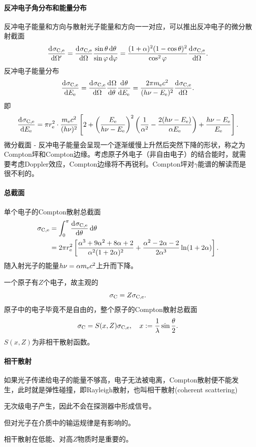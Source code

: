 \paragraph{反冲电子角分布和能量分布}
反冲电子能量和方向与散射光子能量和方向一一对应，可以推出反冲电子的微分散射截面
\[
	\frac{\mathrm{d}^{{}}\sigma_{\mathrm C,\mathrm e}}{\mathrm{d}{\Omega'}^{{}}}=\frac{\mathrm{d}^{{}}\sigma_{\mathrm C,\mathrm e}}{\mathrm{d}{\Omega}^{{}}}\frac{\sin\theta\mathop{}\!\mathrm{d}\theta}{\sin\varphi\mathop{}\!\mathrm{d}\varphi}=\frac{(1+\alpha)^2(1-\cos\theta)^2}{\cos^2\varphi}\frac{\mathrm{d}^{{}}\sigma_{\mathrm C,\mathrm e}}{\mathrm{d}{\Omega}^{{}}}.
\]
反冲电子能量分布
\[
	\frac{\mathrm{d}^{{}}\sigma_{\mathrm C,\mathrm e}}{\mathrm{d}{E_\mathrm e}^{{}}}=\frac{\mathrm{d}^{{}}\sigma_{\mathrm C,\mathrm e}}{\mathrm{d}{\Omega}^{{}}}\frac{\mathrm{d}^{{}}\Omega}{\mathrm{d}{\theta}^{{}}}\frac{\mathrm{d}^{{}}\theta}{\mathrm{d}{E_\mathrm e}^{{}}}=\frac{2\pi m_\mathrm e c^2}{(h\nu-E_\mathrm e)^2}\frac{\mathrm{d}^{{}}\sigma_{\mathrm C,\mathrm e}}{\mathrm{d}{\Omega}^{{}}}.
\]
即
\[
	\frac{\mathrm{d}^{{}}\sigma_{\mathrm C,\mathrm e}}{\mathrm{d}{E_\mathrm e}^{{}}}=\pi r_\mathrm e^2\cdot\frac{m_\mathrm e c^2}{(h\nu)^2}\left[2+\left(\frac{E_\mathrm e}{h\nu-E_\mathrm e}\right)^2\left(\frac1{\alpha^2}-\frac{2(h\nu-E_\mathrm e)}{\alpha E_\mathrm e}\right)+\frac{h\nu-E_\mathrm e}{E_\mathrm e}\right].
\]
微分截面 - 反冲电子能量会呈现一个逐渐缓慢上升然后突然下降的形状，称之为Compton坪和Compton边缘。考虑原子外电子（非自由电子）的结合能时，就需要考虑Doppler效应，Compton边缘将不再锐利。Compton坪对$\gamma$能谱的解读而是很不利的。

\paragraph{总截面}单个电子的Compton散射总截面
\begin{align*}
	\sigma_{\mathrm C,\mathrm e}&=\int_0^\pi\frac{\mathrm{d}^{{}}\sigma_{\mathrm C,\mathrm e}}{\mathrm{d}{\theta}^{{}}}\mathop{}\!\mathrm{d}\theta\\
	&=2\pi r_\mathrm e^2\left[\frac{\alpha^3+9\alpha^2+8\alpha+2}{\alpha^2(1+2\alpha)^2}+\frac{\alpha^2-2\alpha-2}{2\alpha^3}\ln(1+2\alpha)\right].
\end{align*}
随入射光子的能量$h\nu=\alpha m_\mathrm e c^2$上升而下降。

一个原子有$Z$个电子，故主观的
\[
	\sigma_\mathrm C=Z\sigma_{\mathrm C,\mathrm e}.
\]
原子中的电子毕竟不是自由的，整个原子的Compton散射总截面
\begin{align}
	\sigma_\mathrm C=S(x,Z)\sigma_{\mathrm C,\mathrm e},\quad x:=\frac1\lambda\sin\frac\theta{2}.
\end{align}
$S(x,Z)$为非相干散射函数。
\paragraph{相干散射}
如果光子传递给电子的能量不够高，电子无法被电离，Compton散射便不能发生，此时就是弹性碰撞，即Rayleigh散射，也叫相干散射(coherent scattering)
\begin{compactenum}
	\item 无次级电子产生，因此不会在探测器中形成信号。
	\item 但对光子在介质中的输运规律是有影响的。
	\item 相干散射在低能、对高$Z$物质时是重要的。
\end{compactenum}
